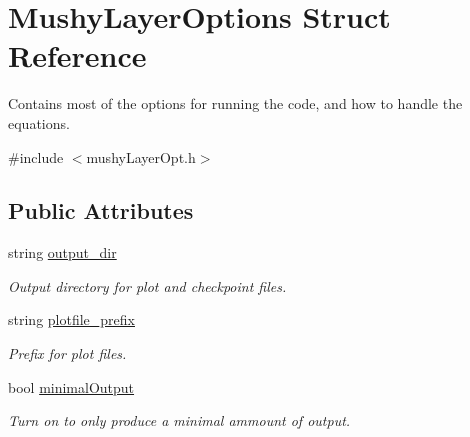 \hypertarget{struct_mushy_layer_options}{}\section{Mushy\+Layer\+Options Struct Reference}
\label{struct_mushy_layer_options}


Contains most of the options for running the code, and how to handle the equations.  




{\ttfamily \#include $<$mushy\+Layer\+Opt.\+h$>$}

\subsection*{Public Attributes}
\begin{DoxyCompactItemize}
\item 
\mbox{\label{struct_mushy_layer_options_a2ee16667e5052743f94322d9c95f954f}} 
string \hyperlink{struct_mushy_layer_options_a2ee16667e5052743f94322d9c95f954f}{output\+\_\+dir}
\begin{DoxyCompactList}\small\item\em Output directory for plot and checkpoint files. \end{DoxyCompactList}\item 
\mbox{\label{struct_mushy_layer_options_aa8faed523736e08a2768e375a06c38b4}} 
string \hyperlink{struct_mushy_layer_options_aa8faed523736e08a2768e375a06c38b4}{plotfile\+\_\+prefix}
\begin{DoxyCompactList}\small\item\em Prefix for plot files. \end{DoxyCompactList}\item 
\mbox{\label{struct_mushy_layer_options_aaaf5949d5a2fdffd663e3cc17814bdfc}} 
bool \hyperlink{struct_mushy_layer_options_aaaf5949d5a2fdffd663e3cc17814bdfc}{minimal\+Output}
\begin{DoxyCompactList}\small\item\em Turn on to only produce a minimal ammount of output. \end{DoxyCompactList}\item 
\mbox{\label{struct_mushy_layer_options_a590103c8a5df7418f6df6e717a842e67}} 

\end{DoxyCompactItemize}
